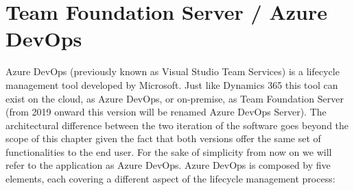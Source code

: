 \section{Team Foundation Server / Azure DevOps} 

Azure DevOps \cite{DevOps} (previously known as Visual Studio Team Services) is a lifecycle management tool developed by Microsoft. Just like Dynamics 365 this tool can exist on the cloud, as Azure DevOps, or on-premise, as Team Foundation Server (from 2019 onward this version will be renamed Azure DevOps Server). The architectural difference between the two iteration of the software goes beyond the scope of this chapter given the fact that both versions offer the same set of functionalities to the end user. For the sake of simplicity from now on we will refer to the application as Azure DevOps. Azure DevOps is composed by five elements, each covering a different aspect of the lifecycle management process:

